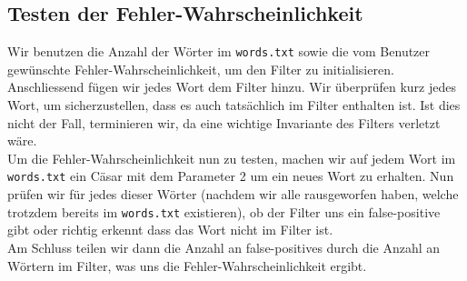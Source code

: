 \documentclass{article}
\begin{document}
    \subsection{Testen der Fehler-Wahrscheinlichkeit}
    Wir benutzen die Anzahl der Wörter im \texttt{words.txt} sowie die vom Benutzer gewünschte Fehler-Wahrscheinlichkeit, um den Filter zu initialisieren. \\
    Anschliessend fügen wir jedes Wort dem Filter hinzu. Wir überprüfen kurz jedes Wort, um sicherzustellen, dass es auch tatsächlich im Filter enthalten ist. Ist dies nicht der Fall, terminieren wir, da eine wichtige Invariante des Filters verletzt wäre.\\
    Um die Fehler-Wahrscheinlichkeit nun zu testen, machen wir auf jedem Wort im \texttt{words.txt} ein Cäsar mit dem Parameter 2 um ein neues Wort zu erhalten. Nun prüfen wir für jedes dieser Wörter (nachdem wir alle rausgeworfen haben, welche trotzdem bereits im \texttt{words.txt} existieren), ob der Filter uns ein false-positive gibt oder richtig erkennt dass das Wort nicht im Filter ist. \\
    Am Schluss teilen wir dann die Anzahl an false-positives durch die Anzahl an Wörtern im Filter, was uns die Fehler-Wahrscheinlichkeit ergibt.


    \newpage
\end{document}

